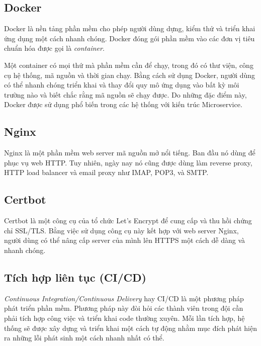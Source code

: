 \documentclass[./../main.tex]{subfiles}
\begin{document}
\hypertarget{docker}{%
\subsection{Docker}\label{docker}}

Docker \cite{Docker22} là nền tảng phần mềm cho phép người dùng dựng, kiểm thử và triển
khai ứng dụng một cách nhanh chóng. Docker đóng gói phần mềm vào các đơn
vị tiêu chuẩn hóa được gọi là \emph{container}.

Một container có mọi thứ mà phần mềm cần để chạy, trong đó có thư viện,
công cụ hệ thống, mã nguồn và thời gian chạy. Bằng cách sử dụng Docker,
người dùng có thể nhanh chóng triển khai và thay đổi quy mô ứng dụng vào
bất kỳ môi trường nào và biết chắc rằng mã nguồn sẽ chạy được. Do những
đặc điểm này, Docker được sử dụng phổ biến trong các hệ thống với kiến
trúc Microservice.

\hypertarget{nginx}{%
\subsection{Nginx}\label{nginx}}

Nginx \cite{Nginx22} là một phần mềm web server mã nguồn mở nổi tiếng. Ban đầu nó dùng
để phục vụ web HTTP. Tuy nhiên, ngày nay nó cũng được dùng làm reverse
proxy, HTTP load balancer và email proxy như IMAP, POP3, và SMTP.

\hypertarget{certbot}{%
\subsection{Certbot}\label{certbot}}

Certbot là một công cụ của tổ chức Let's Encrypt để cung cấp và thu hồi
chứng chỉ SSL/TLS. Bằng việc sử dụng công cụ này kết hợp với web server
Nginx, người dùng có thể nâng cấp server của mình lên HTTPS một cách dễ
dàng và nhanh chóng.

\hypertarget{tuxedch-hux1ee3p-liuxean-tux1ee5c-cicd}{%
\subsection{Tích hợp liên tục
(CI/CD)}\label{tuxedch-hux1ee3p-liuxean-tux1ee5c-cicd}}

\emph{Continuous Integration/Continuous Delivery} hay CI/CD là một
phương pháp phát triển phần mềm. Phương pháp này đòi hỏi các thành viên
trong đội cần phải tích hợp công việc và triển khai code thường xuyên.
Mỗi lần tích hợp, hệ thống sẽ được xây dựng và triển khai một cách tự
động nhằm mục đích phát hiện ra những lỗi phát sinh một cách nhanh nhất
có thể.
\end{document}
